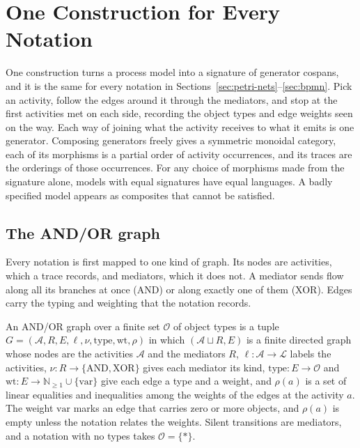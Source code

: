 \section{One Construction for Every Notation}\label{sec:general-framework}

One construction turns a process model into a signature of generator cospans, and it is the
same for every notation in Sections~\ref{sec:petri-nets}--\ref{sec:bpmn}. Pick an activity,
follow the edges around it through the mediators, and stop at the first activities met on each
side, recording the object types and edge weights seen on the way. Each way of joining what the
activity receives to what it emits is one generator. Composing generators freely gives a
symmetric monoidal category, each of its morphisms is a partial order of activity occurrences,
and its traces are the orderings of those occurrences. For any choice of morphisms made from the
signature alone, models with equal signatures have equal languages. A badly specified model appears as composites that cannot be satisfied.

\subsection{The AND/OR graph}
\label{subsec:firing-graphs}

Every notation is first mapped to one kind of graph. Its nodes are activities, which a trace
records, and mediators, which it does not. A mediator sends flow along all its
branches at once (AND) or along exactly one of them (XOR). Edges carry the typing and weighting
that the notation records.

\begin{definition}
  \label{def:lm-graph}
  An AND/OR graph over a finite set $\mathcal{O}$ of object types is a tuple
  $G=(\mathcal{A},R,E,\ell,\nu,\mathrm{type},\mathrm{wt},\rho)$ in which $(\mathcal{A}\sqcup R,E)$
  is a finite directed graph whose nodes are the activities $\mathcal{A}$ and the mediators $R$,
  $\ell:\mathcal{A}\to\mathcal{L}$ labels the activities, $\nu:R\to\{\mathrm{AND},\mathrm{XOR}\}$
  gives each mediator its kind, $\mathrm{type}:E\to\mathcal{O}$ and
  $\mathrm{wt}:E\to\mathbb{N}_{\ge 1}\cup\{\mathrm{var}\}$ give each edge a type and a weight, and
  $\rho(a)$ is a set of linear equalities and inequalities among the weights of the edges at the
  activity $a$. The weight $\mathrm{var}$ marks an edge that carries zero or more objects, and
  $\rho(a)$ is empty unless the notation relates the weights. Silent transitions are mediators,
  and a notation with no types takes $\mathcal{O}=\{\ast\}$.
\end{definition}

